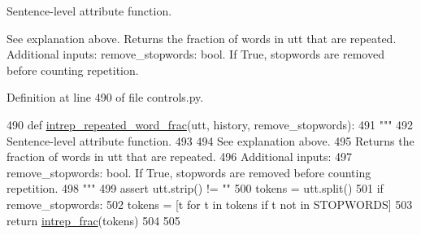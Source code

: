 \begin{DoxyVerb}Sentence-level attribute function.

See explanation above.
Returns the fraction of words in utt that are repeated.
Additional inputs:
  remove_stopwords: bool. If True, stopwords are removed before counting repetition.
\end{DoxyVerb}
 

Definition at line 490 of file controls.\+py.


\begin{DoxyCode}
490 \textcolor{keyword}{def }\hyperlink{namespaceprojects_1_1controllable__dialogue_1_1controllable__seq2seq_1_1controls_a6cac190e0676d3938ec8c2e5bd0c994d}{intrep\_repeated\_word\_frac}(utt, history, remove\_stopwords):
491     \textcolor{stringliteral}{"""}
492 \textcolor{stringliteral}{    Sentence-level attribute function.}
493 \textcolor{stringliteral}{}
494 \textcolor{stringliteral}{    See explanation above.}
495 \textcolor{stringliteral}{    Returns the fraction of words in utt that are repeated.}
496 \textcolor{stringliteral}{    Additional inputs:}
497 \textcolor{stringliteral}{      remove\_stopwords: bool. If True, stopwords are removed before counting repetition.}
498 \textcolor{stringliteral}{    """}
499     \textcolor{keyword}{assert} utt.strip() != \textcolor{stringliteral}{""}
500     tokens = utt.split()
501     \textcolor{keywordflow}{if} remove\_stopwords:
502         tokens = [t \textcolor{keywordflow}{for} t \textcolor{keywordflow}{in} tokens \textcolor{keywordflow}{if} t \textcolor{keywordflow}{not} \textcolor{keywordflow}{in} STOPWORDS]
503     \textcolor{keywordflow}{return} \hyperlink{namespaceprojects_1_1controllable__dialogue_1_1controllable__seq2seq_1_1controls_a6774bd6ac8941123de4574e69686140a}{intrep\_frac}(tokens)
504 
505 
\end{DoxyCode}
\mbox{\label{namespaceprojects_1_1controllable__dialogue_1_1controllable__seq2seq_1_1controls_a42b08e3d8604f6e0b7d88230323cd777}} 
